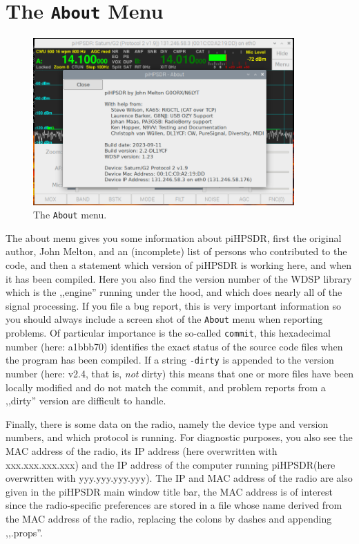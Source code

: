 \documentclass[12pt]{book}
\def\rett#1{\texttt{\color{red}#1}}
\def\bltt#1{\texttt{\color{blue}#1}}
\def\pH{pi\-HPSDR\xspace}
\begin{document}
\clearpage
\section{The \texttt{About} Menu}

\begin{figure}[ht]
\center
\includegraphics[width=10cm]{AboutMenu.png}
\caption{The \bltt{About} menu.}
\end{figure}

The about menu gives you some information about \pH, first the original author,
John Melton,
and an (incomplete) list
of persons who contributed to the code, and then a statement which version of \pH
is working here, and when it has been compiled. Here you also find the version number of the WDSP
 library which is the ,,engine''
running under the hood, and which does nearly all of the signal processing. If you file a bug report,
this is very important information so you should always include a screen shot of the \bltt{About}
menu when reporting problems. Of particular importance is the so-called \rett{commit},
this hexadecimal number (here: a1bbb70) identifies the exact status of the source code files
when the program has been compiled. If a string \texttt{-dirty} is appended to the version number
(here: v2.4, that is, \textit{not} dirty) this means that one or more files have been locally  modified
and do not match the commit, and problem reports from a ,,dirty'' version are difficult to handle.

Finally, there is
some data on the radio, namely the device type and version numbers, and which protocol is running.
For diagnostic purposes, you also see the MAC address of the radio, its IP address (here overwritten
with xxx.xxx.xxx.xxx)
and the
IP address of the computer running \pH (here overwritten with yyy.yyy.yyy.yyy). The IP and MAC address of
the radio are also given in the \pH main window title bar, the MAC address is of interest since the radio-specific
preferences are stored in a file whose name derived from the MAC address of the radio, replacing
the colons by dashes and appending ,,.props''.
\end{document}
